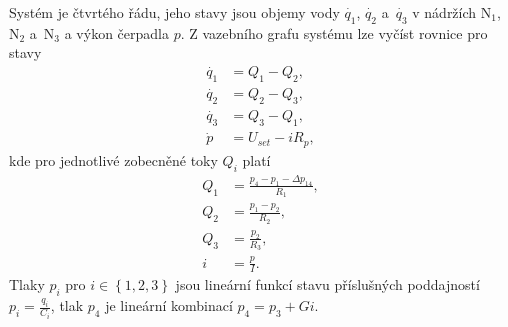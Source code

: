 \documentclass[conference]{IEEEtran}
\begin{document}
Systém je čtvrtého řádu, jeho stavy jsou objemy vody $\dot{q_1}$, $\dot{q_2}$ a~$\dot{q_3}$ v nádržích $\text{N}_1$, $\text{N}_2$ a~$\text{N}_3$
a výkon čerpadla $p$. Z vazebního grafu systému lze vyčíst rovnice pro stavy
\begin{equation}
    \begin{split}
        \dot{q_1} &= Q_1 - Q_2, \\
        \dot{q_2} &= Q_2 - Q_3, \\
        \dot{q_3} &= Q_3 - Q_1, \\
        \dot{p} &= U_{set} - iR_p,
    \end{split}
    \label{eq:stavy}
\end{equation}
kde pro jednotlivé zobecněné toky $Q_i$ platí
\begin{equation}
    \begin{split}
        Q_1 &= \frac{p_4 - p_1 - \Delta p_{14}}{R_1}, \\
        Q_2 &= \frac{p_1-p_2}{R_2}, \\
        Q_3 &= \frac{p_2}{R_3}, \\
        i~&= \frac{p}{I}.
    \end{split}
    \label{eq:toky}
\end{equation}
Tlaky $p_i$ pro $i \in \left\{1,2,3 \right\}$ jsou lineární funkcí stavu příslušných poddajností $p_i = \frac{q_i}{C_i}$,
tlak $p_4$ je lineární kombinací $p_4 = p_3 + Gi$.
\end{document}
